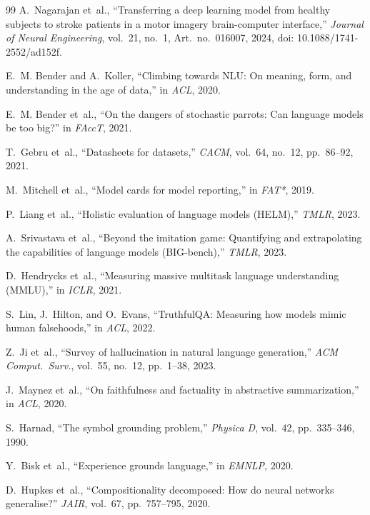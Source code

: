\begin{thebibliography}{99}
A.~Nagarajan et~al., ``Transferring a deep learning model from healthy subjects
to stroke patients in a motor imagery brain-computer interface,'' \emph{Journal
of Neural Engineering}, vol.~21, no.~1, Art.~no.~016007, 2024,
doi: 10.1088/1741-2552/ad152f.

E.~M. Bender and A.~Koller, ``Climbing towards NLU: On meaning, form, and
understanding in the age of data,'' in \emph{ACL}, 2020.

E.~M. Bender et~al., ``On the dangers of stochastic parrots: Can language models
be too big?'' in \emph{FAccT}, 2021.

T.~Gebru et~al., ``Datasheets for datasets,'' \emph{CACM}, vol.~64, no.~12,
pp.~86--92, 2021.

M.~Mitchell et~al., ``Model cards for model reporting,'' in \emph{FAT*}, 2019.

P.~Liang et~al., ``Holistic evaluation of language models (HELM),''
\emph{TMLR}, 2023.

A.~Srivastava et~al., ``Beyond the imitation game: Quantifying and extrapolating
the capabilities of language models (BIG-bench),'' \emph{TMLR}, 2023.

D.~Hendrycks et~al., ``Measuring massive multitask language understanding
(MMLU),'' in \emph{ICLR}, 2021.

S.~Lin, J.~Hilton, and O.~Evans, ``TruthfulQA: Measuring how models mimic human
falsehoods,'' in \emph{ACL}, 2022.

Z.~Ji et~al., ``Survey of hallucination in natural language generation,''
\emph{ACM Comput.\ Surv.}, vol.~55, no.~12, pp.~1--38, 2023.

J.~Maynez et~al., ``On faithfulness and factuality in abstractive
summarization,'' in \emph{ACL}, 2020.

S.~Harnad, ``The symbol grounding problem,'' \emph{Physica D}, vol.~42,
pp.~335--346, 1990.

Y.~Bisk et~al., ``Experience grounds language,'' in \emph{EMNLP}, 2020.

D.~Hupkes et~al., ``Compositionality decomposed: How do neural networks
generalise?'' \emph{JAIR}, vol.~67, pp.~757--795, 2020.


\end{thebibliography}
